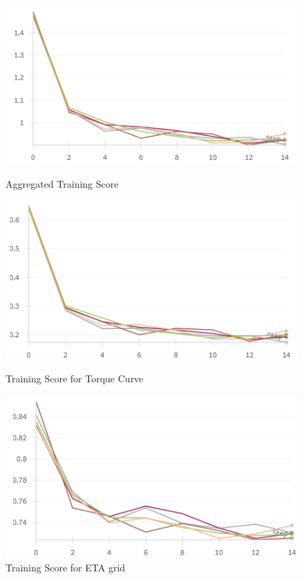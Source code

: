 \documentclass{report} %
\begin{document}
\begin{figure}[H]
    \centering
    \begin{minipage}[b]{0.3\textwidth}
        \includegraphics[width=\textwidth]{./ReportImages/train_score.png}
        \caption{Aggregated Training Score}
        \label{fig:Aggregated Training Score}
    \end{minipage}
    \hfill
    \begin{minipage}[b]{0.3\textwidth}
        \includegraphics[width=\textwidth]{./ReportImages/train_score_y1.png}
        \caption{Training Score for Torque Curve}
        \label{fig:Training Score for Torque Curve}
    \end{minipage}
    \hfill
    \begin{minipage}[b]{0.3\textwidth}
        \includegraphics[width=\textwidth]{./ReportImages/train_score_y2.png}
        \caption{Training Score for ETA grid}
        \label{fig:Training Score for ETA grid}
    \end{minipage}
\end{figure}
\end{document}
